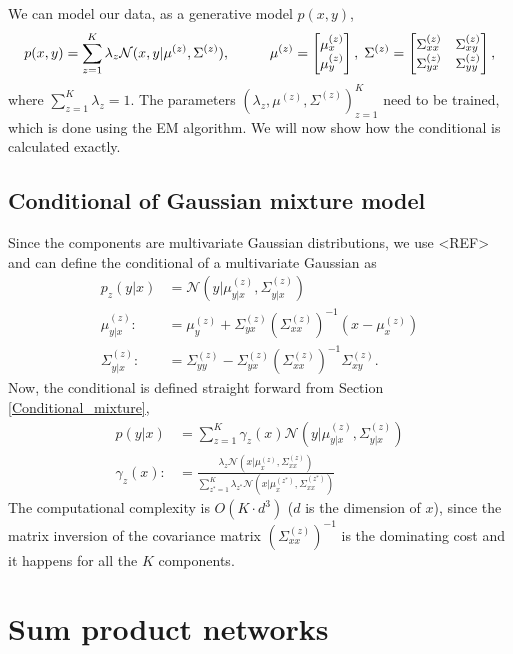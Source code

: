 We can model our data, as a generative model $p(x,y)$, 
$$p(x,y)= \sum_{z=1}^K \lambda_z \mathcal{N}(x,y|\mu^{(z)},\Sigma^{(z)}), \hspace{1cm}
\mu^{(z)}=\begin{bmatrix} \mu^{(z)}_x \\ \mu^{(z)}_y \end{bmatrix},\hspace{0.1cm} \Sigma^{(z)} =
\begin{bmatrix} \Sigma^{(z)}_{xx} & \Sigma^{(z)}_{xy}\\ \Sigma^{(z)}_{yx}& \Sigma^{(z)}_{yy}
\end{bmatrix},$$ where $\sum_{z=1}^K \lambda_z = 1$. The parameters $\left(\lambda_z,
\mu^{(z)}, \Sigma^{(z)} \right)_{z=1}^K$ need to be trained, which is done using the EM
algorithm. We will now show how the conditional is calculated exactly. 

\subsection{Conditional of Gaussian mixture model}
Since the components are multivariate Gaussian distributions, we use <REF> and can define the
conditional of a multivariate Gaussian as
\begin{align}
    p_z(y|x) &= \mathcal{N}(y|\mu^{(z)}_{y|x},\Sigma^{(z)}_{y|x} )\\
    \mu^{(z)}_{y|x} :&= \mu^{(z)}_y+\Sigma^{(z)}_{yx}(\Sigma^{(z)}_{xx})^{-1}(x-\mu^{(z)}_x)\\
    \Sigma^{(z)}_{y|x} :&= \Sigma^{(z)}_{yy}-\Sigma^{(z)}_{yx}(\Sigma^{(z)}_{xx})^{-1}\Sigma^{(z)}_{xy}.
\end{align}
Now, the conditional is defined straight forward from Section \eqref{Conditional_mixture},
\begin{align}
    p(y|x) &= \sum_{z=1}^K \gamma_z(x) \mathcal{N}(y|\mu_{y|x}^{(z)},\Sigma_{y|x}^{(z)} ) \\
    \gamma_z(x) :&=\frac{\lambda_z \mathcal{N}(x|\mu_{x}^{(z)},\Sigma_{xx}^{(z)})}{\sum_{z^*=1}^K \lambda_{z^*}
\mathcal{N}(x|\mu_{x}^{(z^*)},\Sigma_{xx}^{(z^*)})}
\end{align}
The computational complexity is $O(K\cdot d^3)$ ($d$ is the dimension of $x$), since the matrix inversion
of the covariance matrix $(\Sigma^{(z)}_{xx})^{-1}$ is the dominating cost and it happens
for all the $K$ components. 

\section{Sum product networks}

